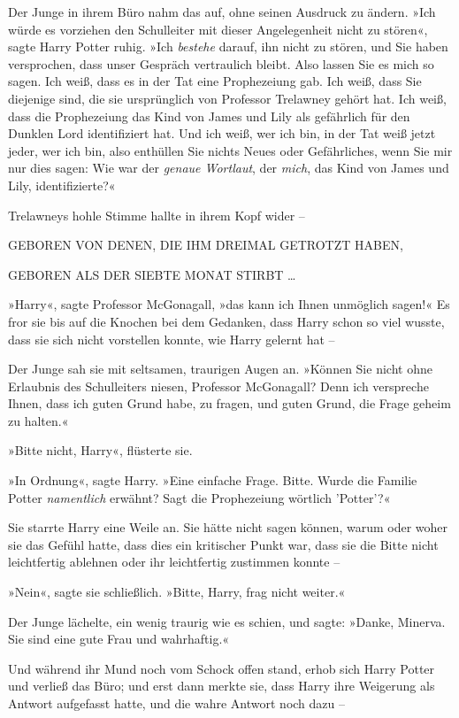 {Der Junge in ihrem Büro nahm das auf, ohne seinen Ausdruck zu ändern. »Ich würde es vorziehen den Schulleiter mit dieser Angelegenheit nicht zu stören«, sagte Harry Potter ruhig. »Ich \emph{bestehe} darauf, ihn nicht zu stören, und Sie haben versprochen, dass unser Gespräch vertraulich bleibt. Also lassen Sie es mich so sagen. Ich weiß, dass es in der Tat eine Prophezeiung gab. Ich weiß, dass Sie diejenige sind, die sie ursprünglich von Professor Trelawney gehört hat. Ich weiß, dass die Prophezeiung das Kind von James und Lily als gefährlich für den Dunklen Lord identifiziert hat. Und ich weiß, wer ich bin, in der Tat weiß jetzt jeder, wer ich bin, also enthüllen Sie nichts Neues oder Gefährliches, wenn Sie mir nur dies sagen: Wie war der \emph{genaue Wortlaut}, der \emph{mich}, das Kind von James und Lily, identifizierte?«

Trelawneys hohle Stimme hallte in ihrem Kopf wider --

GEBOREN VON DENEN, DIE IHM DREIMAL GETROTZT HABEN,

GEBOREN ALS DER SIEBTE MONAT STIRBT …

»Harry«, sagte Professor McGonagall, »das kann ich Ihnen unmöglich sagen!« Es fror sie bis auf die Knochen bei dem Gedanken, dass Harry schon so viel wusste, dass sie sich nicht vorstellen konnte, wie Harry gelernt hat --

Der Junge sah sie mit seltsamen, traurigen Augen an. »Können Sie nicht ohne Erlaubnis des Schulleiters niesen, Professor McGonagall? Denn ich verspreche Ihnen, dass ich guten Grund habe, zu fragen, und guten Grund, die Frage geheim zu halten.«

»Bitte nicht, Harry«, flüsterte sie.

»In Ordnung«, sagte Harry. »Eine einfache Frage. Bitte. Wurde die Familie Potter \emph{namentlich} erwähnt? Sagt die Prophezeiung wörtlich 'Potter'?«

Sie starrte Harry eine Weile an. Sie hätte nicht sagen können, warum oder woher sie das Gefühl hatte, dass dies ein kritischer Punkt war, dass sie die Bitte nicht leichtfertig ablehnen oder ihr leichtfertig zustimmen konnte --

»Nein«, sagte sie schließlich. »Bitte, Harry, frag nicht weiter.«

Der Junge lächelte, ein wenig traurig wie es schien, und sagte: »Danke, Minerva. Sie sind eine gute Frau und wahrhaftig.«

Und während ihr Mund noch vom Schock offen stand, erhob sich Harry Potter und verließ das Büro; und erst dann merkte sie, dass Harry ihre Weigerung als Antwort aufgefasst hatte, und die wahre Antwort noch dazu --

}
